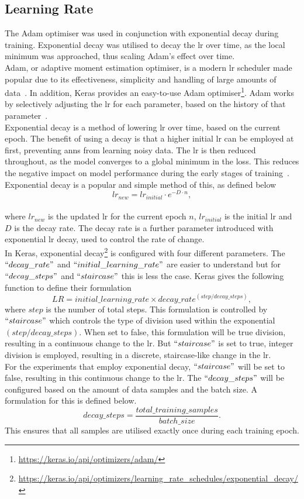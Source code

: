 \subsection{Learning Rate}
\label{sec: Learning Rate}
The Adam optimiser was used in conjunction with exponential decay during training. Exponential decay was utilised to decay the \acrshort{lr} over time, as the local minimum was approached, thus scaling Adam's effect over time.\\
Adam, or adaptive moment estimation optimiser, is a modern \acrshort{lr} scheduler made popular due to its effectiveness, simplicity and handling of large amounts of data~\cite{Adam_OG}. In addition, Keras provides an easy-to-use Adam optimiser\footnote{\url{https://keras.io/api/optimizers/adam/}}. Adam works by selectively adjusting the \acrshort{lr} for each parameter, based on the history of that parameter~\cite{Adam_OG}.\\
Exponential decay is a method of lowering \acrshort{lr} over time, based on the current epoch. The benefit of using a decay is that a higher initial \acrshort{lr} can be employed at first, preventing \acrshort{ann}s from learning noisy data. The \acrshort{lr} is then reduced throughout, as the model converges to a global minimum in the loss. This reduces the negative impact on model performance during the early stages of training~\cite{benefit_of_decay}. Exponential decay is a popular and simple method of this, as defined below
\[lr_{new} = lr_{initial} \cdot e^{-D \cdot n},\]\\
where $lr_{new}$ is the updated \acrshort{lr} for the current epoch $n$, $lr_{initial}$ is the initial \acrshort{lr} and $D$ is the decay rate. The decay rate is a further parameter introduced with exponential \acrshort{lr} decay, used to control the rate of change.\\
In Keras, exponential decay\footnote{\url{https://keras.io/api/optimizers/learning_rate_schedules/exponential_decay/}} is configured with four different parameters. The $``decay\_rate"$ and $``initial\_learning\_rate"$ are easier to understand but for $``decay\_steps"$ and $``staircase"$ this is less the case. Keras gives the following function to define their formulation\\
\[LR = initial\_learning\_rate \times decay\_rate^{(step/decay\_steps)},\]
where $step$ is the number of total steps. This formulation is controlled by $``staircase"$ which controls the type of division used within the exponential $(step/decay\_steps)$. When set to false, this formulation will be true division, resulting in a continuous change to the \acrshort{lr}. But $``staircase"$ is set to true, integer division is employed, resulting in a discrete, staircase-like change in the \acrshort{lr}.\\
For the experiments that employ exponential decay, $``staircase"$ will be set to false, resulting in this continuous change to the \acrshort{lr}. The $``decay\_steps"$ will be configured based on the amount of data samples and the batch size. A formulation for this is defined below.
\[decay\_steps = \frac{total\_training\_samples}{batch\_size}.\]
This ensures that all samples are utilised exactly once during each training epoch.

